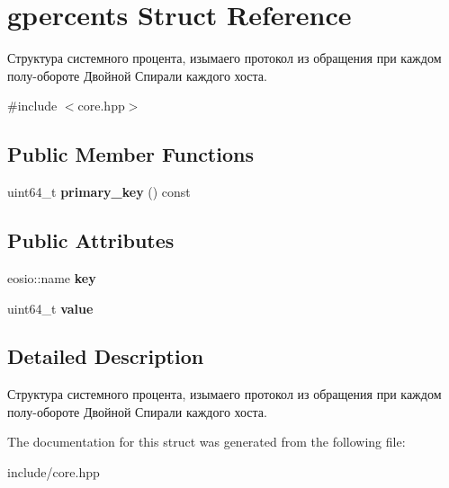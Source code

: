 \hypertarget{structgpercents}{}\section{gpercents Struct Reference}
\label{structgpercents}


Структура системного процента, изымаего протокол из обращения при каждом полу-\/обороте Двойной Спирали каждого хоста.  




{\ttfamily \#include $<$core.\+hpp$>$}

\subsection*{Public Member Functions}
\begin{DoxyCompactItemize}
\item 
\mbox{\label{structgpercents_a68f903552db4ec01f5a5b72e66b3242c}} 
uint64\+\_\+t {\bfseries primary\+\_\+key} () const
\end{DoxyCompactItemize}
\subsection*{Public Attributes}
\begin{DoxyCompactItemize}
\item 
\mbox{\label{structgpercents_a3590265e98954a83b5dcee6622a12a2d}} 
eosio\+::name {\bfseries key}
\item 
\mbox{\label{structgpercents_ab02cef50ba01b31a15e8041e80b57c8e}} 
uint64\+\_\+t {\bfseries value}
\end{DoxyCompactItemize}


\subsection{Detailed Description}
Структура системного процента, изымаего протокол из обращения при каждом полу-\/обороте Двойной Спирали каждого хоста. 

The documentation for this struct was generated from the following file\+:\begin{DoxyCompactItemize}
\item 
include/core.\+hpp\end{DoxyCompactItemize}
